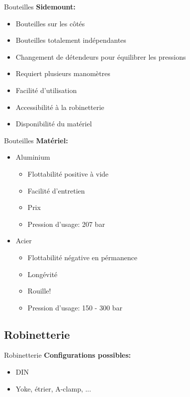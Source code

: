 \begin{frame}{Bouteilles}  
	\textbf{Sidemount:}
	\begin{itemize}
		\item Bouteilles sur les côtés
		\item Bouteilles totalement indépendantes
		\item Changement de détendeurs pour équilibrer les pressions
		\item Requiert plusieurs manomètres
		\item Facilité d'utilisation
		\item Accessibilité à la robinetterie
		\item Disponibilité du matériel
	\end{itemize}
\end{frame}

\begin{frame}{Bouteilles}  
	\textbf{Matériel:}
	\begin{itemize}
			\item Aluminium
			\begin{itemize}
				\item Flottabilité positive à vide
				\item Facilité d'entretien
				\item Prix
				\item Pression d'usage: 207 bar
			\end{itemize}
			\item Acier
			\begin{itemize}
				\item Flottabilité négative en pérmanence
				\item Longévité
				\item Rouille!
				\item Pression d'usage: 150 - 300 bar
			\end{itemize}
		\end{itemize}	
\end{frame}

\subsection{Robinetterie}

\begin{frame}{Robinetterie}  
	\textbf{Configurations possibles:}
	\begin{itemize}
		\item DIN
		\item Yoke, étrier, A-clamp, ...
	\end{itemize}
\end{frame}

